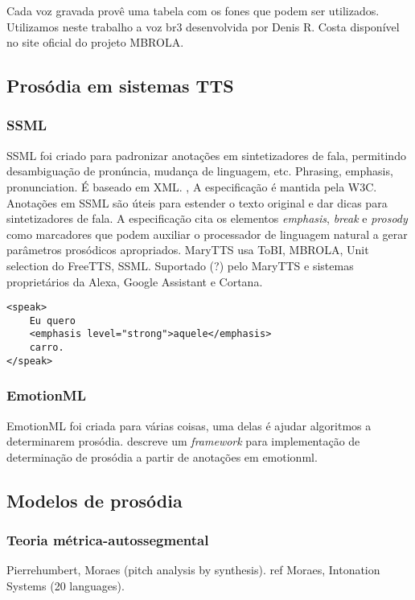 Cada voz gravada provê uma tabela com os fones que podem ser utilizados. Utilizamos neste trabalho a voz br3 desenvolvida por Denis R. Costa disponível no site oficial do projeto MBROLA.

\subsection{Prosódia em sistemas TTS}
\subsubsection{SSML}
SSML foi criado para padronizar anotações em sintetizadores de fala, permitindo
desambiguação de pronúncia, mudança de linguagem, etc. Phrasing, emphasis,
pronunciation. É baseado em XML.
\cite{ssml}, A especificação é mantida pela W3C.
Anotações em SSML são úteis para estender o texto original e dar dicas para
sintetizadores de fala. A especificação cita os elementos \emph{emphasis},
\emph{break} e \emph{prosody} como marcadores que podem auxiliar o processador
de linguagem natural a gerar parâmetros prosódicos apropriados.
MaryTTS usa ToBI, MBROLA, Unit selection do FreeTTS, SSML.
Suportado (?) pelo MaryTTS e sistemas proprietários da Alexa, Google Assistant e Cortana.

\begin{lstlisting}
<speak>
    Eu quero
    <emphasis level="strong">aquele</emphasis> 
    carro.
</speak> 
\end{lstlisting}

\subsubsection{EmotionML}
EmotionML \cite{emotionml} foi criada para várias coisas, uma delas é ajudar
algoritmos a determinarem prosódia. \cite{emotionmary} descreve um
\emph{framework} para implementação de determinação de prosódia a partir de
anotações em emotionml.

\subsection{Modelos de prosódia}
\subsubsection{Teoria métrica-autossegmental}
Pierrehumbert, Moraes (pitch analysis by synthesis). ref Moraes, Intonation Systems (20 languages).
